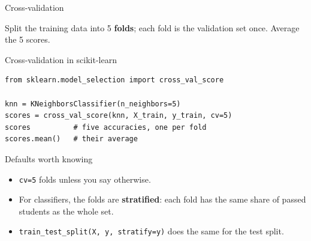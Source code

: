 \documentclass[handout,aspectratio=169,t,9pt]{beamer}
\newcommand{\datablock}[5]{%
  \fill[#4] (#1,#3) rectangle (#2,#3+0.55);
  \draw[white,thick] (#1,#3) rectangle (#2,#3+0.55);
  \node[font=\scriptsize,text=white] at ({(#1+#2)/2},#3+0.275) {#5};}
\begin{document}
\begin{frame}{Cross-validation}
  \vspace{0.2cm}
  \centering

  \vspace{0.3cm}
  \raggedright
  Split the training data into 5 \textbf{folds}; each fold is the validation
  set once.  Average the 5 scores.

\end{frame}

\begin{frame}[fragile]{Cross-validation in scikit-learn}
  \begin{lstlisting}
from sklearn.model_selection import cross_val_score

knn = KNeighborsClassifier(n_neighbors=5)
scores = cross_val_score(knn, X_train, y_train, cv=5)
scores          # five accuracies, one per fold
scores.mean()   # their average
  \end{lstlisting}

  \vfill
  \begin{sibbox}{Defaults worth knowing}
    \begin{itemize}
      \item \texttt{cv=5} folds unless you say otherwise.
      \item For classifiers, the folds are \textbf{stratified}: each fold
            has the same share of passed students as the whole set.
      \item \texttt{train\_test\_split(X, y, stratify=y)} does the same for
            the test split.
    \end{itemize}
  \end{sibbox}

\end{frame}
\end{document}
